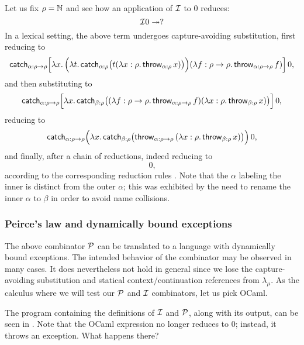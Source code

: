 Let us fix $\rho = \mathbb{N}$ and see how an application of $\mathcal{I}$ to $0$ reduces:
\[ \mathcal{I} 0 \twoheadrightarrow ? \]
In a lexical setting, the above term undergoes capture-avoiding substitution,
first reducing to
\[ \mathsf{catch}_{\alpha : \rho \to \rho} \Big[
	  \lambda x.\,
	  	\Big(\lambda t.\, \mathsf{catch}_{\alpha : \rho}
	  		\big(t (\lambda x : \rho.\, \mathsf{throw}_{\alpha : \rho}\, x)\big)\Big)
	  	(\lambda f : \rho \to \rho.\, \mathsf{throw}_{\alpha: \rho\to\rho} \, f)
   \Big]\,0\text{,}
\]
and then substituting to
\[ \mathsf{catch}_{\alpha : \rho \to \rho} \Big[
	  \lambda x.\,
	  	\mathsf{catch}_{\beta : \rho}
	  		\big((\lambda f : \rho \to \rho.\, \mathsf{throw}_{\alpha: \rho\to\rho} \, f) (\lambda x : \rho.\, \mathsf{throw}_{\beta : \rho}\, x)\big)
   \Big]\,0\text{,}
\]
reducing to
\[ \mathsf{catch}_{\alpha : \rho \to \rho} \Big(
	  \lambda x.\, \mathsf{catch}_{\beta : \rho}
	  		\big(\mathsf{throw}_{\alpha: \rho\to\rho}\,
	  		  (\lambda x : \rho.\, \mathsf{throw}_{\beta : \rho}\, x)
	\big)\Big)\,0\text{,}
\]
and finally, after a chain of reductions, indeed reducing to
\[
	0 \text{,}
\]
according to the corresponding reduction rules \cite{ariola-herbelin, krebbers11, parigot92}.
Note that the $\alpha$ labeling the inner  is distinct
from the outer $\alpha$; this was exhibited by the need to rename the inner $\alpha$
to $\beta$ in order to avoid name collisions.

\subsubsection{Peirce's law and dynamically bound exceptions}

The above combinator $\mathcal{P}$ can be translated to a language with dynamically bound
exceptions. The intended behavior of the combinator may be observed in many cases.
It does nevertheless not hold in general since we lose the capture-avoiding substitution
and statical context/continuation references
from $\lambda_\mu$. As the calculus where we will test our $\mathcal{P}$ and $\mathcal{I}$ combinators,
let us pick OCaml.

The program containing the definitions of $\mathcal{I}$ and $\mathcal{P}$, along with its output,
can be seen in . Note that the OCaml expression  no longer
reduces to $0$; instead, it throws an exception. What happens there?

